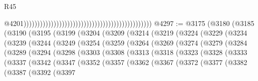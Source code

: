 \begin{lexlean}{R45}
\begin{coremodule}
{                                                                                                  @4201)))))))))))))))))))))))))))))))))))))))))))))))
@4297 := @3175
    (@3180
      (@3185
        (@3190
          (@3195
            (@3199
              (@3204
                (@3209
                  (@3214
                    (@3219
                      (@3224
                        (@3229
                          (@3234
                            (@3239
                              (@3244
                                (@3249
                                  (@3254
                                    (@3259
                                      (@3264
                                        (@3269
                                          (@3274
                                            (@3279
                                              (@3284
                                                (@3289
                                                  (@3294
                                                    (@3298
                                                      (@3303
                                                        (@3308
                                                          (@3313
                                                            (@3318
                                                              (@3323
                                                                (@3328
                                                                  (@3333
                                                                    (@3337
                                                                      (@3342
                                                                        (@3347
                                                                          (@3352
                                                                            (@3357
                                                                              (@3362
                                                                                (@3367
                                                                                  (@3372
                                                                                    (@3377
                                                                                      (@3382
                                                                                        (@3387
                                                                                          (@3392
                                                                                            (@3397
}
\end{coremodule}
\end{lexlean}
